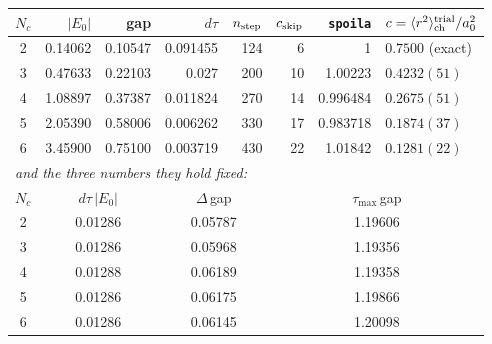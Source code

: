 \begin{tabular}{crrrrrrl}
\hline\hline
$N_c$ & $|E_0|$ & gap & $d\tau$ & $n_{\rm step}$ & $c_{\rm skip}$ & \texttt{spoila} & $c=\langle r^2\rangle_{\rm ch}^{\rm trial}/a_0^2$ \\
\hline
2 & 0.14062 & 0.10547 & 0.091455 & 124 & 6 & 1 & $0.7500$ (exact) \\
3 & 0.47633 & 0.22103 & 0.027 & 200 & 10 & 1.00223 & $0.4232(51)$ \\
4 & 1.08897 & 0.37387 & 0.011824 & 270 & 14 & 0.996484 & $0.2675(51)$ \\
5 & 2.05390 & 0.58006 & 0.006262 & 330 & 17 & 0.983718 & $0.1874(37)$ \\
6 & 3.45900 & 0.75100 & 0.003719 & 430 & 22 & 1.01842 & $0.1281(22)$ \\
\hline
\multicolumn{8}{l}{\emph{and the three numbers they hold fixed:}} \\
$N_c$ & \multicolumn{2}{c}{$d\tau\,|E_0|$} & \multicolumn{2}{c}{$\Delta\,$gap} & \multicolumn{3}{c}{$\tau_{\max}\,$gap} \\
\hline
2 & \multicolumn{2}{c}{0.01286} & \multicolumn{2}{c}{0.05787} & \multicolumn{3}{c}{1.19606} \\
3 & \multicolumn{2}{c}{0.01286} & \multicolumn{2}{c}{0.05968} & \multicolumn{3}{c}{1.19356} \\
4 & \multicolumn{2}{c}{0.01288} & \multicolumn{2}{c}{0.06189} & \multicolumn{3}{c}{1.19358} \\
5 & \multicolumn{2}{c}{0.01286} & \multicolumn{2}{c}{0.06175} & \multicolumn{3}{c}{1.19866} \\
6 & \multicolumn{2}{c}{0.01286} & \multicolumn{2}{c}{0.06145} & \multicolumn{3}{c}{1.20098} \\
\hline\hline
\end{tabular}
